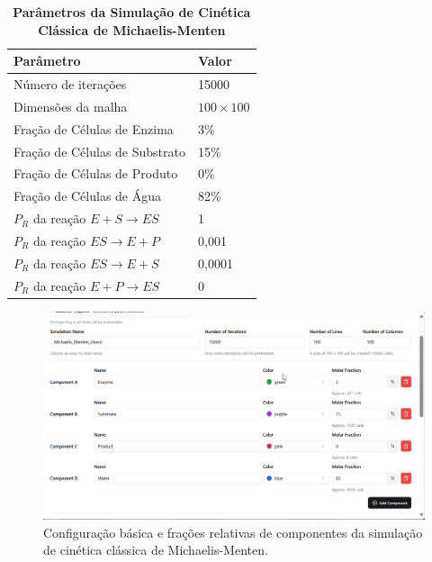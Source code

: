 \documentclass[12pt,oneside]{report}
\begin{document}
\begin{table}
    \centering
    \caption{\textbf{Parâmetros da Simulação de Cinética Clássica de Michaelis-Menten}}
    \vspace{0.2cm}
    \begin{tabularx}{\textwidth}{X m{5cm}}
        \hline
        \textbf{Parâmetro}                     & \textbf{Valor}   \\
        \hline
        Número de iterações                    & 15000            \\
        Dimensões da malha                     & $100 \times 100$ \\
        Fração de Células de Enzima            & 3\%              \\
        Fração de Células de Substrato         & 15\%             \\
        Fração de Células de Produto           & 0\%              \\
        Fração de Células de Água              & 82\%             \\
        $P_R$ da reação $E + S \rightarrow ES$ & 1                \\
        $P_R$ da reação $ES \rightarrow E + P$ & 0{,}001          \\
        $P_R$ da reação $ES \rightarrow E + S$ & 0{,}0001         \\
        $P_R$ da reação $E + P \rightarrow ES$ & 0                \\
        \hline
    \end{tabularx}
    \vspace{0.2cm}
    \label{tab:params_michaelis_menten}
\end{table}

\begin{figure}[H]
    \centering
    \includegraphics[width=1\textwidth]{basic_MM.png}
    \caption{\small Configuração básica e frações relativas de componentes da simulação de cinética clássica de Michaelis-Menten.}
    \label{fig:michaelis_menten}
\end{figure}
\end{document}
